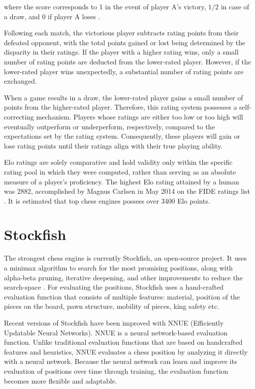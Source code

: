 where the score corresponds to 1 in the event of player A's victory, $1/2$ in case of a draw, and 0 if player A loses \cite{glickman1999rating}.

Following each match, the victorious player subtracts rating points from their defeated opponent, with the total points gained or lost being determined by the disparity in their ratings. If the player with a higher rating wins, only a small number of rating points are deducted from the lower-rated player. However, if the lower-rated player wins unexpectedly, a substantial number of rating points are exchanged.

When a game results in a draw, the lower-rated player gains a small number of points from the higher-rated player. Therefore, this rating system possesses a self-correcting mechanism. Players whose ratings are either too low or too high will eventually outperform or underperform, respectively, compared to the expectations set by the rating system. Consequently, these players will gain or lose rating points until their ratings align with their true playing ability.

Elo ratings are solely comparative and hold validity only within the specific rating pool in which they were computed, rather than serving as an absolute measure of a player's proficiency. The highest Elo rating attained by a human was 2882, accomplished by Magnus Carlsen in May 2014 on the FIDE ratings list \cite{fide-ratings-May2014}. It is estimated that top chess engines possess over 3400 Elo points.

\section{Stockfish}
\label{sec:ch3sec3}

The strongest chess engine is currently Stockfish, an open-source project. It uses a minimax algorithm to search for the most promising positions, along with alpha-beta pruning, iterative deepening, and other improvements to reduce the search-space \cite{maharaj2022chess}. For evaluating the positions, Stockfish uses a hand-crafted evaluation function that consists of multiple features: material, position of the pieces on the board, pawn structure, mobility of pieces, king safety etc. \cite{lai2015giraffe}

Recent versions of Stockfish have been improved with NNUE (Efficiently Updatable Neural Networks). NNUE is a neural network-based evaluation function. Unlike traditional evaluation functions that are based on handcrafted features and heuristics, NNUE evaluates a chess position by analyzing it directly with a neural network. Because the neural network can learn and improve its evaluation of positions over time through training, the evaluation function becomes more flexible and adaptable.

